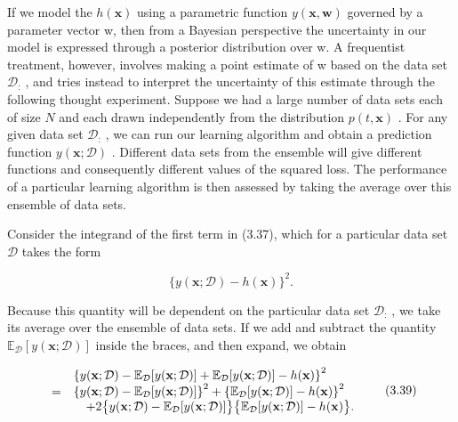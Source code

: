 \documentclass[
  10
]{article}
\begin{document}
If we model the \(h ( \mathbf { x } )\) using a parametric function
\(y ( \mathbf { x } , \mathbf { w } )\) governed by a parameter vector
w, then from a Bayesian perspective the uncertainty in our model is
expressed through a posterior distribution over w. A frequentist
treatment, however, involves making a point estimate of w based on the
data set \(\mathcal { D } _ { : }\) , and tries instead to interpret the
uncertainty of this estimate through the following thought experiment.
Suppose we had a large number of data sets each of size \(N\) and each
drawn independently from the distribution \(p ( t , \mathbf { x } )\) .
For any given data set \(\mathcal { D } _ { : }\) , we can run our
learning algorithm and obtain a prediction function
\(y ( \mathbf { x } ; \mathcal { D } )\) . Different data sets from the
ensemble will give different functions and consequently different values
of the squared loss. The performance of a particular learning algorithm
is then assessed by taking the average over this ensemble of data sets.

Consider the integrand of the first term in (3.37), which for a
particular data set \(\mathcal { D }\) takes the form

\[
\{y (\mathbf {x}; \mathcal {D}) - h (\mathbf {x}) \} ^ {2}.\tag{3.38}
\]

Because this quantity will be dependent on the particular data set
\(\mathcal { D } _ { \mathrm { : } }\) , we take its average over the
ensemble of data sets. If we add and subtract the quantity
\(\mathbb { E } _ { \mathcal { D } } [ y ( \mathbf { x } ; \mathcal { D } ) ]\)
inside the braces, and then expand, we obtain

\[
\begin{array}{r l} & {\left\{y (\mathbf {x}; \mathcal {D}) - \mathbb {E} _ {\mathcal {D}} [ y (\mathbf {x}; \mathcal {D}) ] + \mathbb {E} _ {\mathcal {D}} [ y (\mathbf {x}; \mathcal {D}) ] - h (\mathbf {x}) \right\} ^ {2}} \\ {=} & {\left\{y (\mathbf {x}; \mathcal {D}) - \mathbb {E} _ {\mathcal {D}} [ y (\mathbf {x}; \mathcal {D}) ] \right\} ^ {2} + \left\{\mathbb {E} _ {\mathcal {D}} [ y (\mathbf {x}; \mathcal {D}) ] - h (\mathbf {x}) \right\} ^ {2}} \\ & {\quad + 2 \bigl \{y (\mathbf {x}; \mathcal {D}) - \mathbb {E} _ {\mathcal {D}} [ y (\mathbf {x}; \mathcal {D}) ] \bigr \} \bigl \{\mathbb {E} _ {\mathcal {D}} [ y (\mathbf {x}; \mathcal {D}) ] - h (\mathbf {x}) \bigr \}.} \end{array}\tag{3.39}
\]
\end{document}
